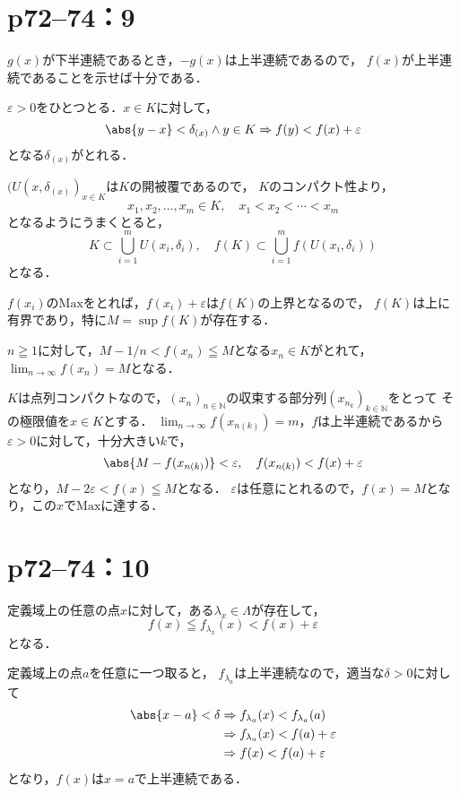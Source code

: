 \section*{p72--74：9}

\begin{tproof}
    $g(x)$が下半連続であるとき，$-g(x)$は上半連続であるので，
    $f(x)$が上半連続であることを示せば十分である．

    $\varepsilon >0$をひとつとる．$ x\in K$に対して，
    \[
        \abs{y-x} < \delta_{(x)} \land y \in K \Rightarrow f(y) < f(x) + \varepsilon
    \]
    となる$\delta_{(x)}$がとれる．

    $(U(x,\delta_{(x)})_{x\in K}$は$K$の開被覆であるので，
    $K$のコンパクト性より，
    \[
        x_1 , x_2, \ldots , x_m \in K , \quad x_1 < x_2 < \cdots < x_m
    \]
    となるようにうまくとると，
    \[
        K \subset \bigcup_{i=1}^m U(x_i,\delta_i) ,\quad f(K) \subset \bigcup_{i=1}^m f(U(x_i,\delta_i))
    \]
    となる．

    $f(x_i)$の$\mathrm{Max}$をとれば，$f(x_i)+\varepsilon$は$f(K)$の上界となるので，
    $f(K)$は上に有界であり，特に$M = \sup f(K)$が存在する．

    $n \geqq 1$に対して，$ M - 1/n < f(x_n) \leqq M$となる$x_n \in K$がとれて，
    $\lim_{n \to \infty} f(x_n) = M$となる．

    $K$は点列コンパクトなので，$(x_n)_{n \in \mathbb{N}}$の収束する部分列$(x_{n_k})_{k \in \mathbb{N}}$をとって
    その極限値を$ x\in K$とする．
    $\lim_{n \to \infty} f(x_{n(k)})=m$，$f$は上半連続であるから
    $\varepsilon >0$に対して，十分大きい$k$で，
    \[
        \abs{M-f(x_{n(k)})} < \varepsilon,\quad f(x_{n(k)})<f(x)+\varepsilon
    \]
    となり，$M-2 \varepsilon < f(x) \leqq M $となる．
    $\varepsilon$は任意にとれるので，$f(x) = M$となり，この$x$で$\mathrm{Max}$に達する．
\end{tproof}


\section*{p72--74：10}

\begin{tproof}
    定義域上の任意の点$x$に対して，ある$ \lambda_x \in \Lambda$が存在して，
    \[
        f(x) \leqq f_{\lambda_x} (x) < f(x) + \varepsilon
    \]
    となる．

    定義域上の点$a$を任意に一つ取ると，
    $f_{\lambda_a}$は上半連続なので，適当な$\delta >0$に対して
    \begin{align*}
        \abs{x-a}<\delta & \Rightarrow f_{\lambda_a}(x) < f_{\lambda_a}(a)     \\
                         & \Rightarrow  f_{\lambda_a}(x) < f (a) + \varepsilon \\
                         & \Rightarrow f(x) < f(a) + \varepsilon
    \end{align*}
    となり，$f(x)$は$x=a$で上半連続である．
\end{tproof}


